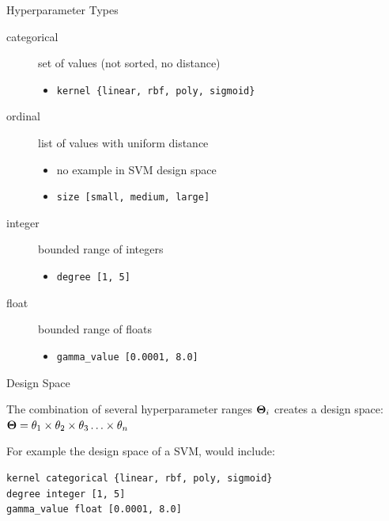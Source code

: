 \begin{frame}[c]{Hyperparameter Types}

\begin{description}
	\item[categorical] set of values (not sorted, no distance)
	\begin{itemize}
	  \item \texttt{kernel \{linear, rbf, poly, sigmoid\}}
	\end{itemize}
	\pause
	\item[ordinal] list of values with uniform distance
	\begin{itemize}
	  \item no example in SVM design space
	  \item \texttt{size [small, medium, large]}
	\end{itemize}
	\pause
	\item[integer] bounded range of integers
	\begin{itemize}
	  \item \texttt{degree [1, 5]}
	\end{itemize}
	\pause
	\item[float] bounded range of floats
	\begin{itemize}
	  \item \texttt{gamma\_value [0.0001, 8.0]}
	\end{itemize}
\end{description}

\end{frame}
\begin{frame}[c,fragile]{Design Space}

The combination of several hyperparameter ranges $\mathbf{\Theta}_i$ creates a design space:
$\mathbf{\Theta} = \theta_1 \times \theta_2 \times \theta_3 \ldots \times \theta_n$ 

\pause
\bigskip

For example the design space of a SVM, would include:

\begin{verbatim}
kernel categorical {linear, rbf, poly, sigmoid}
degree integer [1, 5]
gamma_value float [0.0001, 8.0]
\end{verbatim}

\end{frame}
